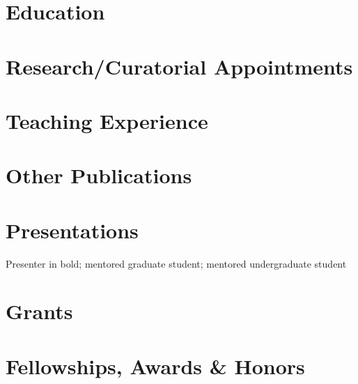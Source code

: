 


\newcommand{\longcontent}[1]{#1}

\newcommand{\oldcontent}[1]{}

\newcommand{\docTitle}{Curriculum Vitae\xspace}


\singlespacing



\section*{Education}


\section*{Research/Curatorial Appointments}


\longcontent{
\section*{Teaching Experience}

}

\nocite{*}
\printbibliography

\longcontent{
\section*{Other Publications}

}

\longcontent{
\section*{Presentations}
Presenter in bold; \gradadvisee{}mentored graduate student;
\undergradadvisee{}mentored undergraduate student


}

\section*{Grants}


\section*{Fellowships, Awards \& Honors}


